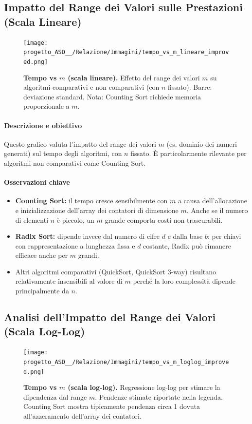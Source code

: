 \documentclass[a4paper, 11pt]{article}
\begin{document}
\subsection{Impatto del Range dei Valori sulle Prestazioni (Scala Lineare)}
\begin{figure}[H]
\centering
\texttt{[image: progetto\_ASD\_\_/Relazione/Immagini/tempo\_vs\_m\_lineare\_improved.png]}
\caption{\textbf{Tempo vs \(m\) (scala lineare).} Effetto del range dei valori \(m\) su algoritmi comparativi e non comparativi (con \(n\) fissato). Barre: deviazione standard. Nota: Counting Sort richiede memoria proporzionale a \(m\).}
\label{fig:variazione_m}
\end{figure}

\paragraph{Descrizione e obiettivo}
Questo grafico valuta l'impatto del range dei valori \(m\) (es. dominio dei numeri generati) sul tempo degli algoritmi, con \(n\) fissato. È particolarmente rilevante per algoritmi non comparativi come Counting Sort.

\paragraph{Osservazioni chiave}
\begin{itemize}
  \item \textbf{Counting Sort:} il tempo cresce sensibilmente con \(m\) a causa dell'allocazione e inizializzazione dell'array dei contatori di dimensione \(m\). Anche se il numero di elementi \(n\) è piccolo, un \(m\) grande comporta costi non trascurabili.
  \item \textbf{Radix Sort:} dipende invece dal numero di cifre \(d\) e dalla base \(b\): per chiavi con rappresentazione a lunghezza fissa e \(d\) costante, Radix può rimanere efficace anche per \(m\) grandi.
  \item Altri algoritmi comparativi (QuickSort, QuickSort 3-way) risultano relativamente insensibili al valore di \(m\) perché la loro complessità dipende principalmente da \(n\).
\end{itemize}

\subsection{Analisi dell'Impatto del Range dei Valori (Scala Log-Log)}
\begin{figure}[H]
\centering
\texttt{[image: progetto\_ASD\_\_/Relazione/Immagini/tempo\_vs\_m\_loglog\_improved.png]}
\caption{\textbf{Tempo vs \(m\) (scala log-log).} Regressione log-log per stimare la dipendenza dal range \(m\). Pendenze stimate riportate nella legenda. Counting Sort mostra tipicamente pendenza circa 1 dovuta all'azzeramento dell'array dei contatori.}
\label{fig:variazione_m}
\end{figure}
\end{document}
